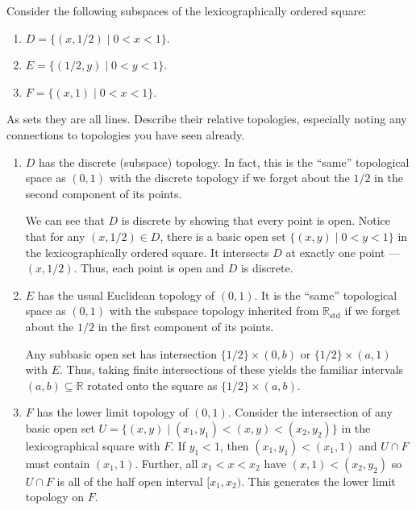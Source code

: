 \documentclass[12 pt, letterpaper]{hmcpset}
\begin{document}
\pagebreak

\begin{problem}[3.31.]
	Consider the following subspaces of the lexicographically ordered square:
	\begin{enumerate}
		\item $D = \{ (x, 1 / 2) \mid 0 < x < 1 \}$.
		\item $E = \{ (1 / 2, y) \mid 0 < y < 1 \}$.
		\item $F = \{ (x, 1) \mid 0 < x < 1 \}$.
	\end{enumerate}
	As sets they are all lines. Describe their relative topologies, especially noting any connections to topologies you have seen already.
\end{problem}

\begin{solution}
	\begin{enumerate}
		\item $D$ has the discrete (subspace) topology. In fact, this is the ``same'' topological space as $(0, 1)$ with the discrete topology if we forget about the $1 / 2$ in the second component of its points.

			We can see that $D$ is discrete by showing that every point is open. Notice that for any $(x, 1 / 2) \in D$, there is a basic open set $\{ (x, y) \mid 0 < y < 1 \}$ in the lexicographically ordered square. It intersects $D$ at exactly one point --- $(x, 1 / 2)$. Thus, each point is open and $D$ is discrete.
		\item $E$ has the usual Euclidean topology of $(0, 1)$. It is the ``same'' topological space as $(0, 1)$ with the subspace topology inherited from $\mathbb{R}_{\text{std}}$ if we forget about the $1 / 2$ in the first component of its points.

			Any subbasic open set has intersection $\{ 1 /2 \} \times (0, b)$ or $\{ 1 / 2 \} \times (a, 1)$ with $E$. Thus, taking finite intersections of these yields the familiar intervals $(a, b) \subseteq \mathbb{R}$ rotated onto the square as $\{ 1 / 2 \} \times (a, b)$.
		\item $F$ has the lower limit topology of $(0, 1)$. Consider the intersection of any basic open set $U = \{ (x, y) \mid (x_{1}, y_{1}) < (x, y) < (x_{2}, y_{2}) \}$ in the lexicographical square with $F$. If  $y_{1} < 1$, then $(x_{1}, y_{1}) < (x_{1}, 1)$ and $U \cap F$ must contain $(x_{1}, 1)$. Further, all $x_{1} < x < x_{2}$ have $(x, 1) < (x_{2}, y_{2})$ so $U \cap F$ is all of the half open interval $[x_{1}, x_{2})$. This generates the lower limit topology on $F$.
	\end{enumerate}
\end{solution}
\end{document}

